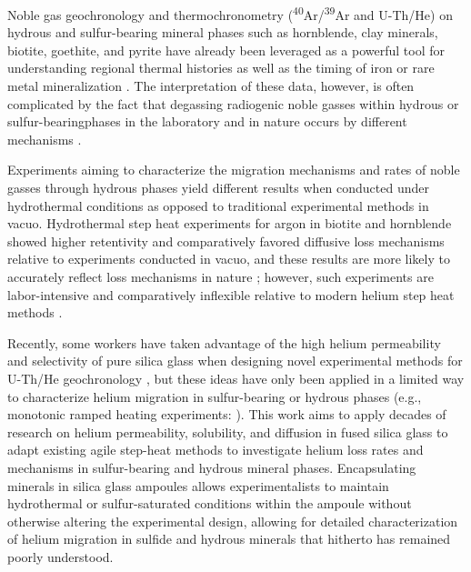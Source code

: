 Noble gas geochronology and thermochronometry (\textsuperscript{40}Ar/\textsuperscript{39}Ar and U-Th/He) on hydrous and sulfur-bearing mineral phases such as hornblende, clay minerals, biotite, goethite, and pyrite have already been leveraged as a powerful tool for understanding regional thermal histories as well as the timing of iron or rare metal mineralization \citep{mcinnes2005,heim2006,vasconcelos2013,nomade2004,yakubovich2020,yakubovich2021}. The interpretation of these data, however, is often complicated by the fact that degassing radiogenic noble gasses within hydrous or sulfur-bearingphases in the laboratory and in nature occurs by different mechanisms \citep{hanson1975,lee1993,lo2000,farley2024}.

Experiments aiming to characterize the migration mechanisms and rates of noble gasses through hydrous phases yield different results when conducted under hydrothermal conditions as opposed to traditional experimental methods in vacuo. Hydrothermal step heat experiments for argon in biotite and hornblende showed higher retentivity and comparatively favored diffusive loss mechanisms relative to experiments conducted in vacuo, and these results are more likely to accurately reflect loss mechanisms in nature \citep{harrison1982,harrison1985}; however, such experiments are labor-intensive and comparatively inflexible relative to modern helium step heat methods \citep{farley1999}.

Recently, some workers have taken advantage of the high helium permeability and selectivity of pure silica glass when designing novel experimental methods for U-Th/He geochronology \citep{yakubovich2020,yakubovich2021}, but these ideas have only been applied in a limited way to characterize helium migration in sulfur-bearing or hydrous phases (e.g., monotonic ramped heating experiments: \citealp{yakubovich2019}). This work aims to apply decades of research on helium permeability, solubility, and diffusion in fused silica glass \citep[e.g.,][]{jones1953,norton1953,rogers1954,altemose1961,swets1961,doremus1966,masaryk1968,shelby1971,shelby1972,shelby1976,shackelford1972} to adapt existing agile step-heat methods \citep{farley1999} to investigate helium loss rates and mechanisms in sulfur-bearing and hydrous mineral phases. Encapsulating minerals in silica glass ampoules allows experimentalists to maintain hydrothermal or sulfur-saturated conditions within the ampoule without otherwise altering the experimental design, allowing for detailed characterization of helium migration in sulfide and hydrous minerals that hitherto has remained poorly understood.

